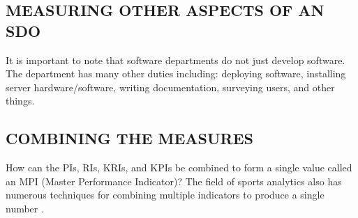 \documentclass[SDSUThesis.tex]{subfiles}
\begin{document}
\subsection{MEASURING OTHER ASPECTS OF AN SDO}

It is important to note that software departments do not just
develop software.  The department has many other duties
including: deploying software, installing server hardware/software,
writing documentation, surveying users, and other things.

\subsection{COMBINING THE MEASURES}

How can the PIs, RIs, KRIs, and KPIs be combined to form a single
value called an MPI (Master Performance Indicator)?  The field
of sports analytics also has numerous techniques for combining
multiple indicators to produce a single number \cite{Cervone2014}.
\end{document}
